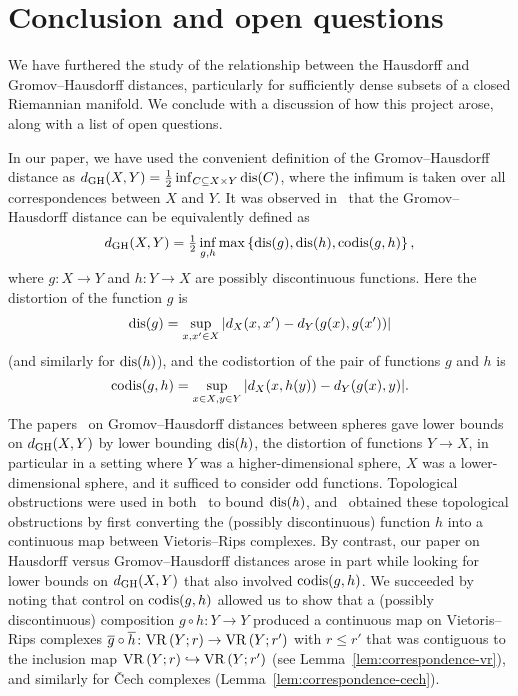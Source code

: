 \documentclass[11pt, reqno, english]{amsart}
\begin{document}



\section{Conclusion and open questions}
\label{sec:conclusion}

We have furthered the study of the relationship between the Hausdorff and Gromov--Hausdorff distances, particularly for sufficiently dense subsets of a closed Riemannian manifold.
We conclude with a discussion of how this project arose, along with a list of open questions.

In our paper, we have used the convenient definition of the Gromov--Hausdorff distance as $d_{\mathrm{GH}}(X,Y) = \tfrac{1}{2} \inf_{C \subseteq X \times Y}\mathrm{dis}(C)$,
where the infimum is taken over all correspondences between $X$ and $Y$.
It was observed in~\cite{kalton1999distances} that the Gromov--Hausdorff distance can be equivalently defined as
\[d_{\mathrm{GH}}(X,Y) = \tfrac{1}{2}\inf_{g,h}\max\left\{\mathrm{dis}(g),\mathrm{dis}(h),\mathrm{codis}(g,h)\right\},\]
where $g\colon X \to Y$ and $h\colon Y \to X$ are possibly discontinuous functions.
Here the distortion of the function $g$ is
\[\mathrm{dis}(g)=\sup_{x,x'\in X}|d_{X}(x,x')-d_{Y}(g(x),g(x'))|\]
(and similarly for $\mathrm{dis}(h)$), and the codistortion of the pair of functions $g$ and $h$ is
\[\mathrm{codis}(g,h)=\sup_{x\in X,y\in Y}|d_{X}(x,h(y))-d_{Y}(g(x),y)|.\]
The papers~\cite{lim2021gromov,GH-BU-VR} on Gromov--Hausdorff distances between spheres gave lower bounds on $d_{\mathrm{GH}}(X,Y)$ by lower bounding $\mathrm{dis}(h)$, the distortion of functions $Y \to X$, in particular in a setting where $Y$ was a higher-dimensional sphere, $X$ was a lower-dimensional sphere, and it sufficed to consider odd functions.
Topological obstructions were used in both~\cite{lim2021gromov,GH-BU-VR} to bound $\mathrm{dis}(h)$, and~\cite{GH-BU-VR} obtained these topological obstructions by first converting the (possibly discontinuous) function $h$ into a continuous map between Vietoris--Rips complexes.
By contrast, our paper on Hausdorff versus Gromov--Hausdorff distances arose in part while looking for lower bounds on $d_{\mathrm{GH}}(X,Y)$ that also involved $\mathrm{codis}(g,h)$.
We succeeded by noting that control on $\mathrm{codis}(g,h)$ allowed us to show that a (possibly discontinuous) composition $g\circ h\colon Y\to Y$ produced a continuous map on Vietoris--Rips complexes $\overline{g}\circ\overline{h}\colon\mathrm{VR}\left(Y;r\right)\to\mathrm{VR}\left(Y;r'\right)$ with $r \le r'$ that was contiguous to the inclusion map $\mathrm{VR}\left(Y;r\right)\hookrightarrow\mathrm{VR}\left(Y;r'\right)$ (see Lemma~\ref{lem:correspondence-vr}), and similarly for \v{C}ech complexes (Lemma~\ref{lem:correspondence-cech}).
\end{document}
